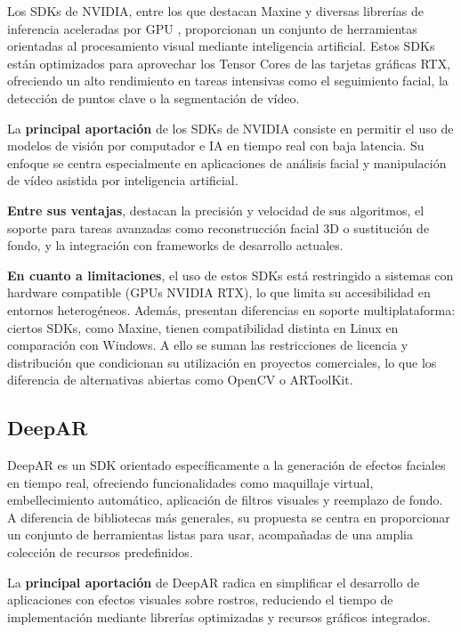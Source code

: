 Los SDKs de NVIDIA, entre los que destacan Maxine y diversas librerías de inferencia aceleradas por GPU \citep{SDK_NVIDIA}, proporcionan un conjunto de herramientas orientadas al procesamiento visual mediante inteligencia artificial. Estos SDKs están optimizados para aprovechar los Tensor Cores de las tarjetas gráficas RTX, ofreciendo un alto rendimiento en tareas intensivas como el seguimiento facial, la detección de puntos clave o la segmentación de vídeo.

La \textbf{principal aportación} de los SDKs de NVIDIA consiste en permitir el uso de modelos de visión por computador e IA en tiempo real con baja latencia. Su enfoque se centra especialmente en aplicaciones de análisis facial y manipulación de vídeo asistida por inteligencia artificial.

\textbf{Entre sus ventajas}, destacan la precisión y velocidad de sus algoritmos, el soporte para tareas avanzadas como reconstrucción facial 3D o sustitución de fondo, y la integración con frameworks de desarrollo actuales.

\textbf{En cuanto a limitaciones}, el uso de estos SDKs está restringido a sistemas con hardware compatible (GPUs NVIDIA RTX), lo que limita su accesibilidad en entornos heterogéneos. Además, presentan diferencias en soporte multiplataforma: ciertos SDKs, como Maxine, tienen compatibilidad distinta en Linux en comparación con Windows. A ello se suman las restricciones de licencia y distribución que condicionan su utilización en proyectos comerciales, lo que los diferencia de alternativas abiertas como OpenCV o ARToolKit.

\subsection{DeepAR}
\label{subsec:deepar}

DeepAR \citep{DeepAR} es un SDK orientado específicamente a la generación de efectos faciales en tiempo real, ofreciendo funcionalidades como maquillaje virtual, embellecimiento automático, aplicación de filtros visuales y reemplazo de fondo. A diferencia de bibliotecas más generales, su propuesta se centra en proporcionar un conjunto de herramientas listas para usar, acompañadas de una amplia colección de recursos predefinidos.

La \textbf{principal aportación} de DeepAR radica en simplificar el desarrollo de aplicaciones con efectos visuales sobre rostros, reduciendo el tiempo de implementación mediante librerías optimizadas y recursos gráficos integrados.

